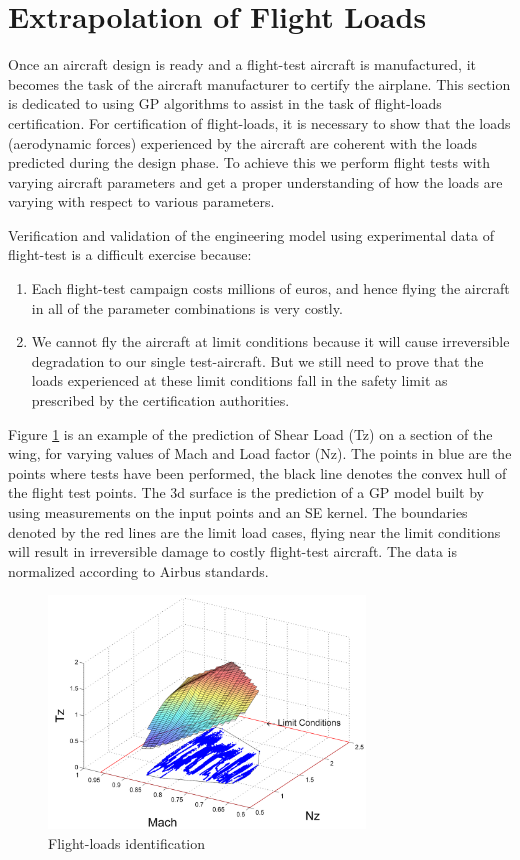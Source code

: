 \section{Extrapolation of Flight Loads}\label{subsecMTGPExtrapolation}
Once an aircraft design is ready and a flight-test aircraft is manufactured, it becomes the task of the aircraft manufacturer to certify the airplane. This section is dedicated to using GP algorithms to assist in the task of flight-loads certification. For certification of flight-loads, it is necessary to show that the loads (aerodynamic forces) experienced by the aircraft are coherent with the loads predicted during the design phase. To achieve this we perform flight tests with varying aircraft parameters and get a proper understanding of how the loads are varying with respect to various parameters.

Verification and validation of the engineering model using experimental data of flight-test is a difficult exercise because:
\begin{enumerate}
\item Each flight-test campaign costs millions of euros, and hence flying the aircraft in all of the parameter combinations is very costly.
\item We cannot fly the aircraft at limit conditions because it will cause irreversible degradation to our single test-aircraft. But we still need to prove that the loads experienced at these limit conditions fall in the safety limit as prescribed by the certification authorities.
\end{enumerate}

Figure \ref{fig:flightLoadsDiagram} is an example of the prediction of Shear Load (Tz) on a section of the wing, for varying values of Mach and Load factor (Nz). The points in blue are the points where tests have been performed, the black line denotes the convex hull of the flight test points. The 3d surface is the prediction of a GP model built by using measurements on the input points and an SE kernel. The boundaries denoted by the red lines are the limit load cases, flying near the limit conditions will result in irreversible damage to costly flight-test aircraft. The data is normalized according to Airbus standards.

\begin{figure}[ht!]
 \centering
 \includegraphics[width=0.75\textwidth]{images/part3/loadDomain}
 \caption{Flight-loads identification}
 \label{fig:flightLoadsDiagram}
\end{figure}

